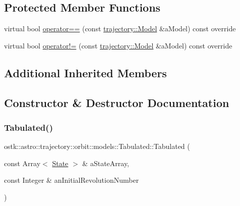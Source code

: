 \subsection*{Protected Member Functions}
\begin{DoxyCompactItemize}
\item 
virtual bool \hyperlink{classostk_1_1astro_1_1trajectory_1_1orbit_1_1models_1_1_tabulated_abd72010cb413d8479c097376bfebaf56}{operator==} (const \hyperlink{classostk_1_1astro_1_1trajectory_1_1_model}{trajectory\+::\+Model} \&a\+Model) const override
\item 
virtual bool \hyperlink{classostk_1_1astro_1_1trajectory_1_1orbit_1_1models_1_1_tabulated_a17610dc24fefecd03ae595cc78ef3079}{operator!=} (const \hyperlink{classostk_1_1astro_1_1trajectory_1_1_model}{trajectory\+::\+Model} \&a\+Model) const override
\end{DoxyCompactItemize}
\subsection*{Additional Inherited Members}


\subsection{Constructor \& Destructor Documentation}
\mbox{\label{classostk_1_1astro_1_1trajectory_1_1orbit_1_1models_1_1_tabulated_aee7a0780a163332e41338e7176da97df}} 
\subsubsection{\texorpdfstring{Tabulated()}{Tabulated()}}
{\footnotesize\ttfamily ostk\+::astro\+::trajectory\+::orbit\+::models\+::\+Tabulated\+::\+Tabulated (\begin{DoxyParamCaption}\item[{const Array$<$ \hyperlink{classostk_1_1astro_1_1trajectory_1_1_state}{State} $>$ \&}]{a\+State\+Array,  }\item[{const Integer \&}]{an\+Initial\+Revolution\+Number }\end{DoxyParamCaption})}



